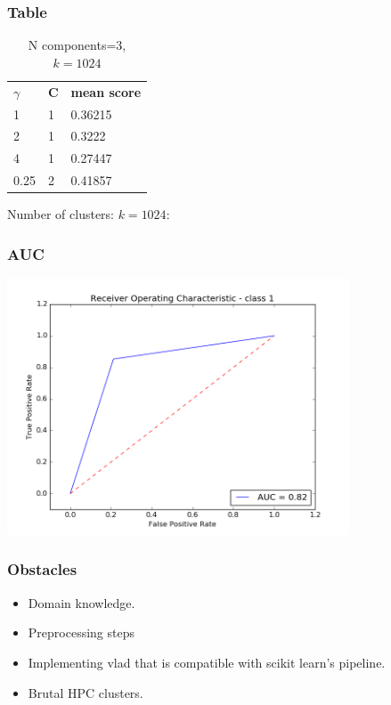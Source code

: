 \documentclass{beamer}
\begin{document}
\begin{frame}
\frametitle{Table}
\begin{table}
\begin{tabular}{l l l}
\toprule
$\gamma$ & \textbf{C} & \textbf{mean score} \\


1 &1 & 0.36215\\
2 & 1 & 0.3222\\
4 & 1 & 0.27447\\
0.25&2&0.41857\\
\bottomrule
\end{tabular}
\caption{N components=3, $k=1024$}
\end{table}
\end{frame}


\begin{frame}
Number of clusters: $k=1024$: 
\frametitle{AUC}
\begin{center}
\includegraphics[height=3.0in]{roc.png}
\end{center}
\end{frame}


\begin{frame}
\frametitle{Obstacles}
\begin{itemize}
\item Domain knowledge.
\item Preprocessing steps
\item Implementing vlad that is compatible with scikit learn's pipeline.
\item Brutal HPC clusters.
\end{itemize}
\end{frame} 
\end{document}
